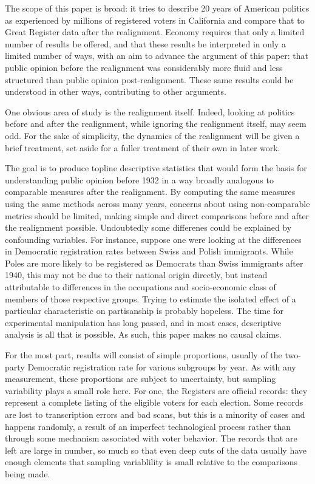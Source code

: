 \documentclass[11pt]{scrartcl}\usepackage[]{graphicx}\usepackage[]{color}
\begin{document}
The scope of this paper is broad: it tries to describe 20 years of American politics as experienced by millions of registered voters in California and compare that to Great Register data after the realignment. Economy requires that only a limited number of results be offered, and that these results be interpreted in only a limited number of ways, with an aim to advance the argument of this paper: that public opinion before the realignment was considerably more fluid and less structured than public opinion post-realignment. These same results could be understood in other ways, contributing to other arguments. 



One obvious area of study is the realignment itself.  Indeed, looking at politics before and after the realignment, while ignoring the realignment itself, may seem odd. For the sake of simplicity, the dynamics of the realignment will be given a brief treatment, set aside for a fuller treatment of their own in later work.

The goal is to produce topline descriptive statistics that would form the basis for understanding public opinion before 1932 in a way broadly analogous to comparable measures after the realignment. By computing the same measures using the same methods across many years, concerns about using non-comparable metrics should be limited, making simple and direct comparisons before and after the realignment possible.  Undoubtedly some differenes could be explained by confounding variables.  For instance, suppose one were looking at the differences in Democratic registration rates between Swiss and Polish immigrants. While Poles are more likely to be registered as Democrats than Swiss immigrants after 1940, this may not be due to their national origin directly,  but instead attributable to differences in the occupations and socio-economic class of members of those respective groups. Trying to estimate the isolated effect of a particular characteristic on partisanship is probably hopeless. The time for experimental manipulation has long passed, and in most cases, descriptive analysis is all that is possible. As such, this paper makes no causal claims.

For the most part, results will consist of simple proportions, usually of the two-party Democratic registration rate for various subgroups by year. As with any measurement, these proportions are subject to uncertainty, but sampling variability plays a small role here. For one, the Registers are official records: they represent a complete listing of the eligible voters for each election. Some records are lost to transcription errors and bad scans, but this is a minority of cases and happens randomly, a result of an imperfect technological process rather than through some mechanism associated with voter behavior. The records that are left are large in number, so much so that even deep cuts of the data usually have enough elements that sampling variablility is small relative to the comparisons being made. 
\end{document}
